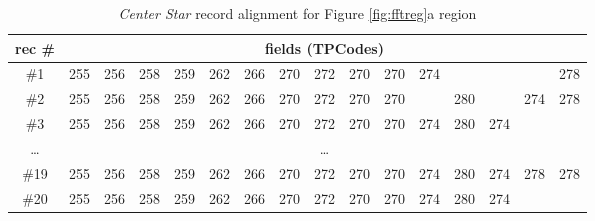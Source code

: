 \begin{table}[h]
\centering
\caption{\small{\textit{Center Star} record alignment for Figure \ref{fig:fftreg}a region}}
\label{table:align}
\begin{tiny}
\setlength\tabcolsep{2.3pt}
\begin{tabular}
{|c|l|l|l|l|l|l|l|l|l|l|l|l|l|l|l|} \hline
rec \#&\multicolumn{15}{c|}{fields (TPCodes)}\\ \hline
 \#1&255&256&258&259&262&266&270&272&270&270&274&   &   &   &278\\ \hline
 \#2&255&256&258&259&262&266&270&272&270&270&   &280&   &274&278\\ \hline
 \#3&255&256&258&259&262&266&270&272&270&270&274&280&274&   &   \\ \hline
 \ldots&\multicolumn{15}{|c|}{\ldots}   \\ \hline
\#19&255&256&258&259&262&266&270&272&270&270&274&280&274&278&278\\ \hline
\#20&255&256&258&259&262&266&270&272&270&270&274&280&274&   &   \\ \hline
\end{tabular}
\end{tiny}%
\end{table}

